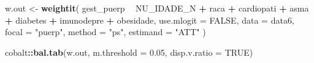 \documentclass[
]{article}
\newenvironment{Shaded}{\begin{snugshade}}{\end{snugshade}}
\newcommand{\DataTypeTok}[1]{\textcolor[rgb]{0.13,0.29,0.53}{#1}}
\newcommand{\FloatTok}[1]{\textcolor[rgb]{0.00,0.00,0.81}{#1}}
\newcommand{\KeywordTok}[1]{\textcolor[rgb]{0.13,0.29,0.53}{\textbf{#1}}}
\newcommand{\NormalTok}[1]{#1}
\newcommand{\OperatorTok}[1]{\textcolor[rgb]{0.81,0.36,0.00}{\textbf{#1}}}
\newcommand{\OtherTok}[1]{\textcolor[rgb]{0.56,0.35,0.01}{#1}}
\newcommand{\StringTok}[1]{\textcolor[rgb]{0.31,0.60,0.02}{#1}}
\begin{document}
\begin{Shaded}
\begin{Highlighting}[]
\NormalTok{w.out <-}
\StringTok{  }\KeywordTok{weightit}\NormalTok{(}
\NormalTok{    gest_puerp }\OperatorTok{~}\StringTok{ }\NormalTok{NU_IDADE_N }\OperatorTok{+}\StringTok{ }\NormalTok{raca }\OperatorTok{+}\StringTok{ }\NormalTok{cardiopati }\OperatorTok{+}\StringTok{ }\NormalTok{asma }\OperatorTok{+}\StringTok{ }\NormalTok{diabetes }\OperatorTok{+}\StringTok{ }\NormalTok{imunodepre }\OperatorTok{+}\StringTok{ }\NormalTok{obesidade, }
    \DataTypeTok{use.mlogit =} \OtherTok{FALSE}\NormalTok{,}
    \DataTypeTok{data =}\NormalTok{ data6,}
    \DataTypeTok{focal =} \StringTok{"puerp"}\NormalTok{,}
    \DataTypeTok{method =} \StringTok{"ps"}\NormalTok{,}
    \DataTypeTok{estimand =} \StringTok{"ATT"}
\NormalTok{  ) }
\end{Highlighting}
\end{Shaded}

\begin{Shaded}
\begin{Highlighting}[]
\NormalTok{cobalt}\OperatorTok{::}\KeywordTok{bal.tab}\NormalTok{(w.out, }\DataTypeTok{m.threshold =} \FloatTok{0.05}\NormalTok{, }\DataTypeTok{disp.v.ratio =} \OtherTok{TRUE}\NormalTok{)}
\end{Highlighting}
\end{Shaded}
\end{document}
